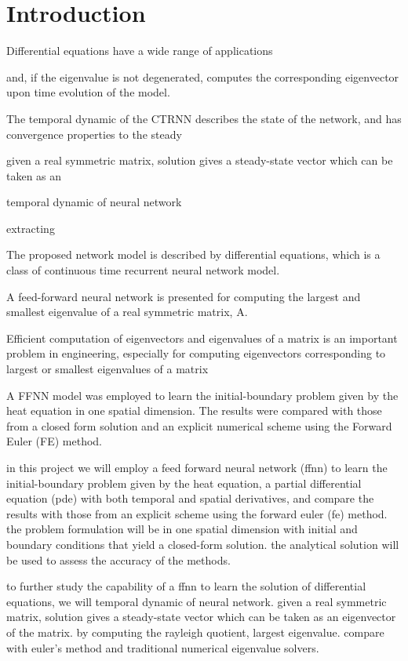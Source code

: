 \section{Introduction}\label{sec:Introduction}

Differential equations have a wide range of applications 


and, if the eigenvalue is not degenerated, computes the corresponding eigenvector upon time evolution of the model. 

The temporal dynamic of the CTRNN describes the state of the network, and has convergence properties to the steady  

given a real symmetric matrix, solution gives a steady-state vector which can be taken as an

temporal dynamic of neural network

extracting


The proposed network model is described by differential equations, which is a class of continuous time recurrent neural network model. 

A feed-forward neural network is presented for computing the largest and smallest eigenvalue of a real symmetric matrix, A.


Efficient computation of eigenvectors and eigenvalues of a matrix is an important problem in engineering, especially for computing eigenvectors corresponding to largest or smallest eigenvalues of a matrix

A FFNN model was employed to learn the initial-boundary problem given by the heat equation in one spatial dimension. The results were compared with those from a closed form solution and an explicit numerical scheme using the Forward Euler (FE) method.

in this project we will employ a feed forward neural network (ffnn) to learn the initial-boundary problem given by the heat equation, a partial differential equation (pde) with both temporal and spatial derivatives, and compare the results with those from an explicit scheme using the forward euler (fe) method. the problem formulation will be in one spatial dimension with initial and boundary conditions that yield a closed-form solution. the analytical solution will be used to assess the accuracy of the methods. 

to further study the capability of a ffnn to learn the solution of differential equations, we will 
temporal dynamic of neural network. given a real symmetric matrix, solution gives a steady-state vector which can be taken as an eigenvector of the matrix. by computing the rayleigh quotient, largest eigenvalue.
compare with euler's method and traditional numerical eigenvalue solvers.


